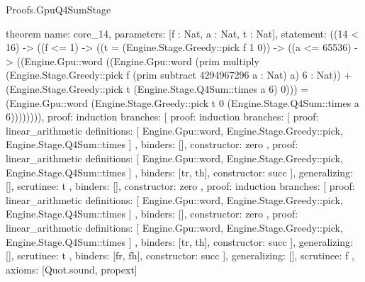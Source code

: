 \begin{lexlean}{Proofs.GpuQ4SumStage}
\begin{semanticmodule}
theorem{
  name: core_14,
  parameters: [f : Nat, a : Nat, t : Nat],
  statement: ((14 < 16) -> ((f <= 1) -> ((t = (Engine.Stage.Greedy::pick f 1 0)) -> ((a <= 65536) -> ((Engine.Gpu::word ((Engine.Gpu::word (prim multiply (Engine.Stage.Greedy::pick f (prim subtract 4294967296 a : Nat) a) 6 : Nat)) + (Engine.Stage.Greedy::pick t (Engine.Stage.Q4Sum::times a 6) 0))) = (Engine.Gpu::word (Engine.Stage.Greedy::pick t 0 (Engine.Stage.Q4Sum::times a 6)))))))),
  proof: induction{
    branches: [
      {
        proof: induction{
          branches: [
            {
              proof: linear_arithmetic{
                definitions: [
                  Engine.Gpu::word,
                  Engine.Stage.Greedy::pick,
                  Engine.Stage.Q4Sum::times
                ]
              },
              binders: [],
              constructor: zero
            },
            {
              proof: linear_arithmetic{
                definitions: [
                  Engine.Gpu::word,
                  Engine.Stage.Greedy::pick,
                  Engine.Stage.Q4Sum::times
                ]
              },
              binders: [tr, th],
              constructor: succ
            }
          ],
          generalizing: [],
          scrutinee: t
        },
        binders: [],
        constructor: zero
      },
      {
        proof: induction{
          branches: [
            {
              proof: linear_arithmetic{
                definitions: [
                  Engine.Gpu::word,
                  Engine.Stage.Greedy::pick,
                  Engine.Stage.Q4Sum::times
                ]
              },
              binders: [],
              constructor: zero
            },
            {
              proof: linear_arithmetic{
                definitions: [
                  Engine.Gpu::word,
                  Engine.Stage.Greedy::pick,
                  Engine.Stage.Q4Sum::times
                ]
              },
              binders: [tr, th],
              constructor: succ
            }
          ],
          generalizing: [],
          scrutinee: t
        },
        binders: [fr, fh],
        constructor: succ
      }
    ],
    generalizing: [],
    scrutinee: f
  },
  axioms: [Quot.sound, propext]
}


\end{semanticmodule}
\end{lexlean}
